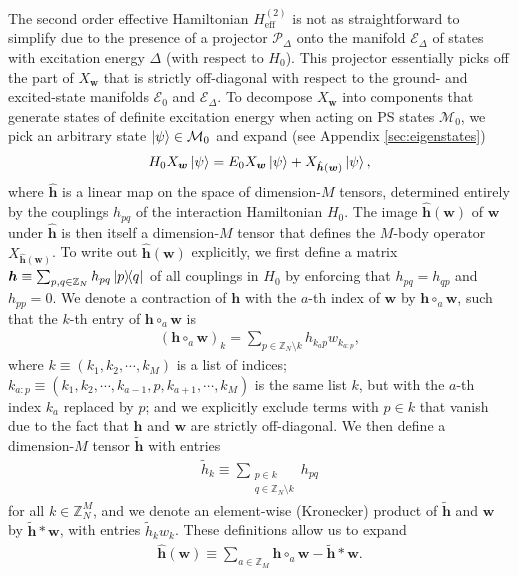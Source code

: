 \documentclass[nofootinbib,notitlepage,11pt]{revtex4-2}
\renewcommand{\t}{\text} %
\newcommand{\p}[1]{\left(#1\right)} %
\newcommand{\m}{\bm} %
\newcommand{\1}{\mathds{1}}
\newcommand{\E}{\mathcal{E}}
\newcommand{\M}{\mathcal{M}}
\renewcommand{\P}{\mathcal{P}}
\newcommand{\ZZ}{\mathbb{Z}}
\begin{document}
The second order effective Hamiltonian $H_{\t{eff}}^{(2)}$ is not as
straightforward to simplify due to the presence of a projector
$\P_\Delta$ onto the manifold $\E_\Delta$ of states with excitation
energy $\Delta$ (with respect to $H_0$).  This projector essentially
picks off the part of $X_{\m w}$ that is strictly off-diagonal with
respect to the ground- and excited-state manifolds $\E_0$ and
$\E_\Delta$.  To decompose $X_{\m w}$ into components that generate
states of definite excitation energy when acting on PS states $\M_0$,
we pick an arbitrary state $\ket\psi\in\M_0$ and expand (see Appendix
\ref{sec:eigenstates})
\begin{align}
  H_0 X_{\m w} \ket\psi
  = E_0 X_{\m w} \ket\psi + X_{\hat{\m h}\p{\m w}} \ket\psi,
  \label{eq:diagnosis}
\end{align}
where $\hat{\m h}$ is a linear map on the space of dimension-$M$
tensors, determined entirely by the couplings $h_{pq}$ of the
interaction Hamiltonian $H_0$.  The image $\hat{\m h}\p{\m w}$ of
$\m w$ under $\hat{\m h}$ is then itself a dimension-$M$ tensor that
defines the $M$-body operator $X_{\hat{\m h}\p{\m w}}$.  To write out
$\hat{\m h}\p{\m w}$ explicitly, we first define a matrix
$\m h\equiv\sum_{p,q\in\ZZ_N} h_{pq} \op{p}{q}$ of all couplings in
$H_0$ by enforcing that $h_{pq}=h_{qp}$ and $h_{pp}=0$.  We denote a
contraction of $\m h$ with the $a$-th index of $\m w$ by
$\m h \circ_a\m w$, such that the $k$-th entry of $\m h \circ_a\m w$
is
\begin{align}
  \p{\m h \circ_a \m w}_k
  = \sum_{p\in\ZZ_N\setminus k} h_{k_a p} w_{k_{a:p}},
\end{align}
where $k\equiv\p{k_1,k_2,\cdots,k_M}$ is a list of indices;
$k_{a:p}\equiv\p{k_1,k_2,\cdots,k_{a-1},p,k_{a+1},\cdots,k_M}$ is the
same list $k$, but with the $a$-th index $k_a$ replaced by $p$; and we
explicitly exclude terms with $p\in k$ that vanish due to the fact
that $\m h$ and $\m w$ are strictly off-diagonal.  We then define a
dimension-$M$ tensor $\tilde{\m h}$ with entries
\begin{align}
  \tilde h_k \equiv \sum_{\substack{p\in k\\q\in\ZZ_N\setminus k}} h_{pq}
\end{align}
for all $k\in\ZZ_N^M$, and we denote an element-wise (Kronecker)
product of $\tilde{\m h}$ and $\m w$ by $\tilde{\m h} * \m w$, with
entries $\tilde h_k w_k$.  These definitions allow us to expand
\begin{align}
  \hat{\m h}\p{\m w}
  \equiv \sum_{a\in\ZZ_M} \m h \circ_a \m w - \tilde{\m h} * \m w.
  \label{eq:multi_body_eig_op}
\end{align}
\end{document}
